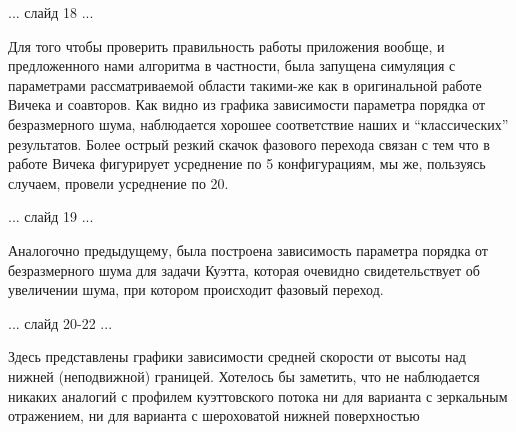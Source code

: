 \documentclass[a4paper,14pt,russian]{extreport}
\begin{document}
  ... слайд 18 ...

  Для того чтобы проверить правильность работы приложения вообще, и предложенного нами алгоритма в частности, была запущена симуляция с параметрами рассматриваемой области такими-же как в оригинальной работе Вичека и соавторов. Как видно из графика зависимости параметра порядка от безразмерного шума, наблюдается хорошее соответствие наших и ``классических'' результатов. Более острый резкий скачок фазового перехода связан с тем что в работе Вичека фигурирует усреднение по 5 конфигурациям, мы же, пользуясь случаем, провели усреднение по 20.

  ... слайд 19 ...

  Аналогочно предыдущему, была построена зависимость параметра порядка от безразмерного шума для задачи Куэтта, которая очевидно свидетельствует об увеличении шума, при котором происходит фазовый переход.

  ... слайд 20-22 ...

  Здесь представлены графики зависимости средней скорости от высоты над нижней (неподвижной) границей. Хотелось бы заметить, что не наблюдается никаких аналогий с профилем куэттовского потока ни для варианта с зеркальным отражением, ни для варианта с шероховатой нижней поверхностью
\end{document}
